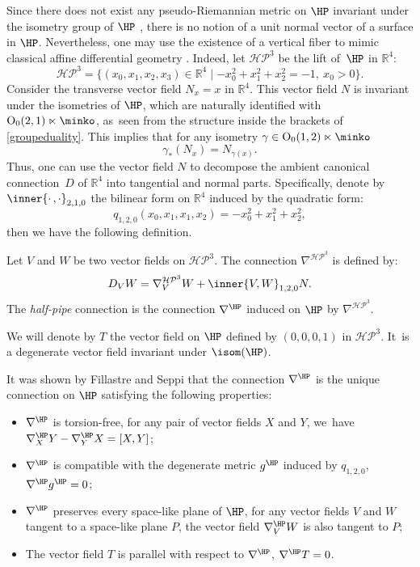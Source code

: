 Since there does not exist any pseudo-Riemannian metric on $\HP$ invariant under the isometry group of $\HP$ \cite[Fact 3.11]{fillastreseppi}, there is no notion of a unit normal vector of a surface in $\HP$. Nevertheless, one may use the existence of a vertical fiber to mimic classical affine differential geometry \cite{affine_diff_geometry}. Indeed, let $\mathcal{HP}^3$ be the lift of~$\HP$ in $\mathbb{R}^4$:
\[
\mathcal{HP}^3=\{(x_0,x_1,x_2,x_3)\in\mathbb{R}^4\mid -x_0^2+x_1^2+x_2^2=-1, \ x_0>0 \}.
\]
Consider the transverse vector field $N_x=x$ in $\mathbb{R}^4$. This vector field $N$ is invariant under the isometries of $\HP$, which are naturally identified with $\mathrm{O}_{0}(2,1)\ltimes\minko$, as~seen from the structure inside the brackets of \eqref{groupeduality}. This implies that for any isometry $\gamma\in\mathrm{O}_{0}(1,2)\ltimes\minko$
\[
\gamma_{*}(N_x) = N_{\gamma(x)}.
\]
Thus, one can use the vector field $N$ to decompose the ambient canonical connection~$D$ of $\mathbb{R}^4$ into tangential and normal parts. Specifically, denote by $\inner{\cdot\,,\cdot}_{2,1,0}$ the bilinear form on $\mathbb{R}^4$ induced by the quadratic form:
\[
q_{1,2,0}(x_0,x_1,x_1,x_2)=-x_0^2+x_1^2+x_2^2,
\]
then we have the following definition.

\begin{defi} Let $V$ and $W$ be two vector fields on $\mathcal{HP}^3$. The connection
$\nabla^{\mathcal{HP}^3}$ is defined by:
\[
D_VW=\nabla^{\mathcal{HP}^3}_VW+\inner{V,W}_{1,2,0}N.
\]
The \emph{half-pipe} connection is the connection $\nabla^{\HP}$
induced on $\HP$ by $\nabla^{\mathcal{HP}^3}$.
\end{defi}
We will denote by $T$ the vector field on $\HP$ defined by $(0, 0, 0, 1)$ in $\mathcal{HP}^3$. It~is a degenerate vector field invariant under $\isom(\HP)$.
\begin{remark}
It was shown by Fillastre and Seppi \cite[Props.\, 5.3 \& 5.11]{fillastreseppi} that the connection $\nabla^{\HP}$ is the unique connection on $\HP$ satisfying the following properties:
\begin{itemize}
\item $\nabla^{\HP}$ is torsion-free, \ie for any pair of vector fields $X$ and $Y$, we~have $\nabla^{\HP}_X Y - \nabla^{\HP}_Y X = [X, Y]$;
\item $\nabla^{\HP}$ is compatible with the degenerate metric $g^{\HP}$ induced by $q_{1,2,0}$, \ie $\nabla^{\HP} g^{\HP} = 0$;
\item $\nabla^{\HP}$ preserves every space-like plane of $\HP$, \ie for any vector fields $V$ and $W$ tangent to a space-like plane $P$, the vector field $\nabla^{\HP}_V W$ is also tangent to $P$;
\item The vector field $T$ is parallel with respect to $\nabla^{\HP}$, \ie $\nabla^{\HP} T = 0$.
\end{itemize}
\end{remark}

